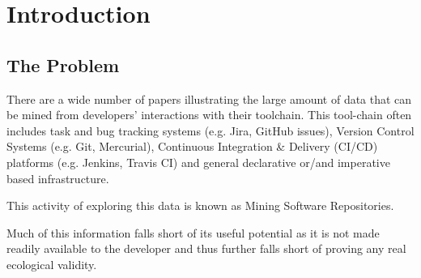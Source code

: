 \chapter{Introduction}

\section{The Problem}

\normalfont There are a wide number of papers illustrating the large amount of data that can be mined from developers' interactions with their toolchain. This tool-chain often includes task and bug tracking systems (e.g. Jira, GitHub issues), Version Control Systems (e.g. Git, Mercurial), Continuous Integration \& Delivery (CI/CD) platforms (e.g. Jenkins, Travis CI) and general declarative or/and imperative based infrastructure.

This activity of exploring this data is known as Mining Software Repositories.

Much of this information falls short of its useful potential as it is not made readily available to the developer and thus further falls short of proving any real ecological validity.